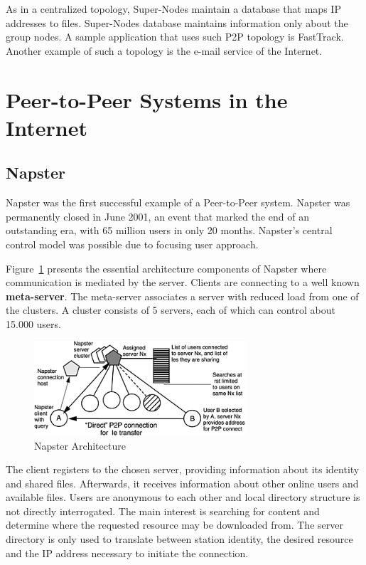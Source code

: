 As in a centralized topology, Super-Nodes maintain a database that maps IP
addresses to files. Super-Nodes database maintains information only about
the group nodes. A sample application that uses such P2P topology is
FastTrack. Another example of such a topology is the e-mail service of the
Internet.

\section{Peer-to-Peer Systems in the Internet}
\label{sec:p2p-systems:p2p-internet}

\subsection{Napster}

Napster was the first successful example of a Peer-to-Peer system. Napster was
permanently closed in June 2001, an event that marked the end of an
outstanding era, with 65 million users in only 20 months. Napster's central
control model was possible due to focusing user approach.

Figure~\ref{fig:p2p-systems:napster} presents the essential architecture
components of Napster where communication is mediated by the server. Clients
are connecting to a well known \textbf{meta-server}. The meta-server
associates a server with reduced load from one of the clusters. A cluster
consists of 5 servers, each of which can control about 15.000 users.

\begin{figure}
  \centering
  \includegraphics[width=0.7\textwidth]{src/img/p2p-systems/napster}
  \caption{Napster Architecture}
  \label{fig:p2p-systems:napster}
\end{figure}

The client registers to the chosen server, providing information about its
identity and shared files. Afterwards, it receives information about other
online users and available files. Users are anonymous to each other and local
directory structure is not directly interrogated. The main interest is
searching for content and determine where the requested resource may be
downloaded from.  The server directory is only used to translate between
station identity, the desired resource and the IP address necessary to
initiate the connection.

